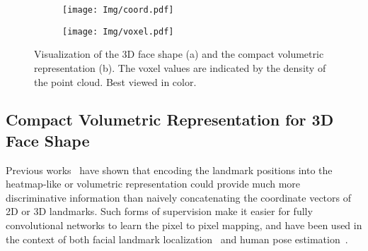 \documentclass[a4paper,conference]{IEEEtran}
\begin{document}
\begin{figure}[t]
	\centering
	\begin{subfigure}[b]{0.2\textwidth}
		\centering
		\texttt{[image: Img/coord.pdf]}
		\caption{ }
		\label{fig:coordinate}
	\end{subfigure}
	\hspace{5mm}
	\begin{subfigure}[b]{0.2\textwidth}
		\centering
		\texttt{[image: Img/voxel.pdf]}
		\caption{ }
		\label{fig:volumetric}
	\end{subfigure}
	\caption{Visualization of the 3D face shape (a) and the compact volumetric representation (b). The voxel values are indicated by the density of the point cloud. Best viewed in color.}
	\label{fig:visualVoxel}
\end{figure}


\subsection{Compact Volumetric Representation for 3D Face Shape}

Previous works~\cite{tompson2014joint,pavlakos2017coarse} have shown that encoding the landmark positions into the heatmap-like or volumetric representation could provide much more discriminative information than naively concatenating the coordinate vectors of 2D or 3D landmarks.
Such forms of supervision make it easier for fully convolutional networks to learn the pixel to pixel mapping,
and have been used in the context of both facial landmark localization~\cite{bulat2016convolutional} and human pose estimation~\cite{tompson2014joint}.
\end{document}
